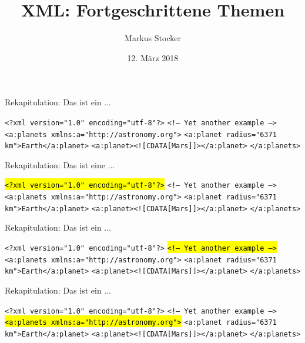 \documentclass{beamer}
\title{XML: Fortgeschrittene Themen}
\author{Markus Stocker}
\date{12. März 2018}
\makeatletter
\newcommand\SoulColor{%
	\let\set@color\beamerorig@set@color
	\let\reset@color\beamerorig@reset@color}
\makeatother
\begin{document}
\maketitle

\begin{frame}{Rekapitulation: Das ist ein ...}
	
	\texttt{<?xml version="1.0" encoding="utf-8"?>} \newline
	\texttt{<!-- Yet another example -->} \newline
	\texttt{<a:planets xmlns:a="http://astronomy.org">} \newline
	\texttt{<a:planet radius="6371 km">Earth</a:planet>} \newline
	\texttt{<a:planet><![CDATA[Mars]]></a:planet>} \newline
	\texttt{</a:planets>}
	
\end{frame}

\begin{frame}{Rekapitulation: Das ist eine ...}
	
	\SoulColor\hl{\texttt{<?xml version="1.0" encoding="utf-8"?>}} \newline
	\texttt{<!-- Yet another example -->} \newline
	\texttt{<a:planets xmlns:a="http://astronomy.org">} \newline
	\texttt{<a:planet radius="6371 km">Earth</a:planet>} \newline
	\texttt{<a:planet><![CDATA[Mars]]></a:planet>} \newline
	\texttt{</a:planets>}
	
\end{frame}

\begin{frame}{Rekapitulation: Das ist ein ...}
	
	\texttt{<?xml version="1.0" encoding="utf-8"?>} \newline
	\SoulColor\hl{\texttt{<!-- Yet another example -->}} \newline
	\texttt{<a:planets xmlns:a="http://astronomy.org">} \newline
	\texttt{<a:planet radius="6371 km">Earth</a:planet>} \newline
	\texttt{<a:planet><![CDATA[Mars]]></a:planet>} \newline
	\texttt{</a:planets>}
	
\end{frame}

\begin{frame}{Rekapitulation: Das ist ein ...}
	
	\texttt{<?xml version="1.0" encoding="utf-8"?>} \newline
	\texttt{<!-- Yet another example -->} \newline
	\SoulColor\hl{\texttt{<a:planets xmlns:a="http://astronomy.org">}} \newline
	\texttt{<a:planet radius="6371 km">Earth</a:planet>} \newline
	\texttt{<a:planet><![CDATA[Mars]]></a:planet>} \newline
	\texttt{</a:planets>}
	
\end{frame}
\end{document}
